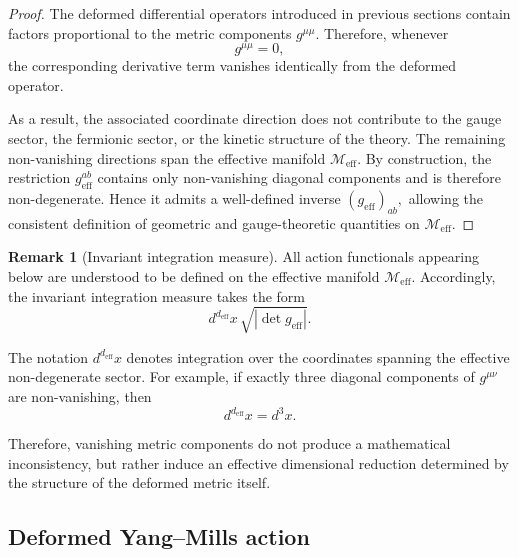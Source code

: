 \documentclass[12pt,a4paper]{article}
\theoremstyle{plain}
\theoremstyle{definition}
\newtheorem{remark}[theorem]{Remark}
\begin{document}
\begin{proof}

The deformed differential operators introduced in previous sections contain factors proportional to the metric components \(g^{\mu\mu}\). Therefore, whenever
\[
g^{\mu\mu}=0,
\]
the corresponding derivative term vanishes identically from the deformed operator.

As a result, the associated coordinate direction does not contribute to the gauge sector, the fermionic sector, or the kinetic structure of the theory. The remaining non-vanishing directions span the effective manifold $
\mathcal{M}_{\mathrm{eff}}$. By construction, the restriction $
g_{\mathrm{eff}}^{ab}$
contains only non-vanishing diagonal components and is therefore non-degenerate. Hence it admits a well-defined inverse $
(g_{\mathrm{eff}})_{ab},
$
allowing the consistent definition of geometric and gauge-theoretic quantities on \(\mathcal{M}_{\mathrm{eff}}\).

\end{proof}

\begin{remark}[Invariant integration measure]

All action functionals appearing below are understood to be defined on the effective manifold \(\mathcal{M}_{\mathrm{eff}}\). Accordingly, the invariant integration measure takes the form
\[
d^{d_{\mathrm{eff}}}x\,
\sqrt{
\left|
\det g_{\mathrm{eff}}
\right|
}.
\]

The notation $
d^{d_{\mathrm{eff}}}x$
denotes integration over the coordinates spanning the effective non-degenerate sector. For example, if exactly three diagonal components of \(g^{\mu\nu}\) are non-vanishing, then
\[
d^{d_{\mathrm{eff}}}x=d^3x.
\]

Therefore, vanishing metric components do not produce a mathematical inconsistency, but rather induce an effective dimensional reduction determined by the structure of the deformed metric itself.

\end{remark}

\subsection{Deformed Yang--Mills action}
\end{document}
